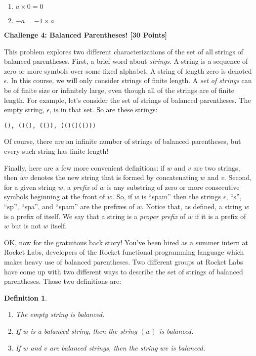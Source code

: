 \documentclass[11pt]{article}
\newtheorem{definition}{Definition}
\newcommand{\Problem}[3]{\mbox{} \newline \noindent \textbf{\textbf{Challenge #1: #2 [#3 Points] \\ }}}
\begin{document}
\begin{enumerate}
	\item $a \times 0 = 0$
	\item $-a = -1 \times a$
\end{enumerate}

\Problem{4}{Balanced Parentheses!}{30}

This problem explores two different characterizations of the set of all strings of balanced parentheses.  
First, a brief word about \emph{strings}.  A string is a sequence of zero or more symbols over some fixed alphabet.  A string of length zero is denoted $\epsilon$. In this course, we will only consider strings of finite length.  
A \emph{set of strings} can be of finite size or infinitely large, even though all of the strings are of finite length.  
For example, let's consider the set of strings of balanced parentheses. The empty string, $\epsilon$, is in that set.  So are these strings:
\begin{verbatim}
(), ()(), (()), (()()(()))
\end{verbatim}
Of course, there are an infinite number of strings of balanced parentheses, but every such string has finite length!

Finally, here are a few more convenient definitions:  if $w$ and $v$ are two strings, then $wv$ denotes the new string that is formed by concatenating $w$ and $v$.  Second, for a given string $w$, a \emph{prefix} of $w$ is any substring of zero or more consecutive symbols beginning at the front of $w$.  So, if $w$ is ``spam'' then the strings $\epsilon$, ``s'', ``sp'', ``spa'', and ``spam'' are the prefixes of $w$.  Notice that, as defined, a string $w$ is a prefix of itself.  We say that a string is a \emph{proper prefix} of $w$ if it is a prefix of $w$ but is not $w$ itself. 

OK, now for the gratuitous back story!  You've been hired as a summer  intern at Rocket Labs, developers of the Rocket functional programming language which makes heavy use of balanced parentheses. Two different groups at Rocket Labs have come up with two different ways to describe the set of strings of balanced parentheses.
Those two definitions are:

\begin{definition} \mbox{}
	\begin{enumerate}
		\item The empty string is balanced.
		\item If $w$ is a balanced string, then the string $(w)$ is balanced.
		\item If $w$ and $v$ are balanced strings, then the string $wv$ is balanced.
	\end{enumerate}
\end{definition}
\end{document}
